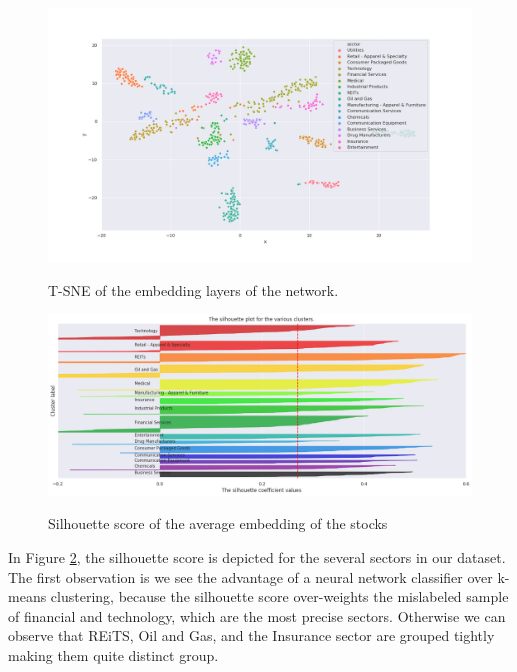 \documentclass[a4paper,twoside]{article}
\begin{document}
\begin{landscape}
  \begin{figure}    
  \begin{center}
    \label{fig:tine-embedding}
    \includegraphics[height=\textheight]{./figures/tsne.png}
    \caption{T-SNE of the embedding layers of the network.}
    \end{center}
  \end{figure}

  \begin{figure}    
  \begin{center}
    \label{fig:silhouette-score}
    \includegraphics[height=\textheight]{./figures/silouhette_score}
    \caption{Silhouette score of the average embedding of the stocks}
    \end{center}
  \end{figure}
\end{landscape}

In Figure \ref{fig:silhouette-score}, the silhouette score is depicted for the
several sectors in our dataset. The first observation is we see the advantage
of a neural network classifier over k-means clustering, because the silhouette
score over-weights the mislabeled sample of financial and technology, which are
the most precise sectors. Otherwise we can observe that REiTS, Oil and Gas,
and the Insurance sector are grouped tightly making them quite distinct group.
\end{document}
